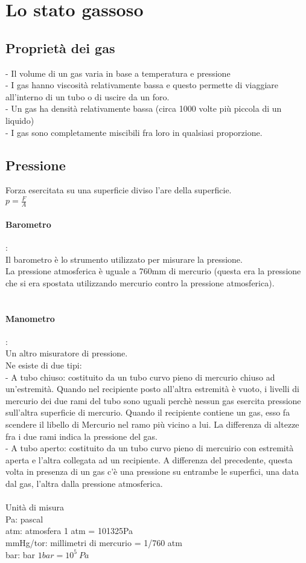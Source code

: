 \section{Lo stato gassoso}
\subsection{Proprietà dei gas}
\tab- Il volume di un gas varia in base a temperatura e pressione\\
\tab- I gas hanno viscosità relativamente bassa e questo permette di viaggiare all'interno di un tubo o di uscire da un foro.\\
\tab- Un gas ha densità relativamente bassa (circa 1000 volte più piccola di un liquido)\\
\tab- I gas sono completamente miscibili fra loro in qualsiasi proporzione.
\subsection{Pressione}
Forza esercitata su una superficie diviso l'are della superficie.\\
$p = \frac{F}{A}$\\
\paragraph*{Barometro}:\\
Il barometro è lo strumento utilizzato per misurare la pressione.\\
La pressione atmosferica è uguale a 760mm di mercurio (questa era la pressione che si era spostata utilizzando mercurio contro la pressione atmosferica).\\\\
\paragraph*{Manometro}:\\
Un altro misuratore di pressione.\\
Ne esiste di due tipi:\\
\tab- A tubo chiuso: costituito da un tubo curvo pieno di mercurio chiuso ad un'estremità. Quando nel recipiente posto all'altra estremità è vuoto, i livelli di mercurio dei due rami del tubo sono uguali perchè nessun gas esercita pressione sull'altra superficie di mercurio. Quando il recipiente contiene un gas, esso fa scendere il libello di Mercurio nel ramo più vicino a lui. La differenza di altezze fra i due rami indica la pressione del gas.\\ 
\tab- A tubo aperto: costituito da un tubo curvo pieno di mercuirio con estremità aperta e l'altra collegata ad un recipiente. A differenza del precedente, questa volta in presenza di un gas c'è una pressione su entrambe le superfici, una data dal gas, l'altra dalla pressione atmosferica.\\\\
Unità di misura\\
Pa: pascal\\
atm: atmosfera 1 atm = 101325Pa\\
mmHg/tor: millimetri di mercurio = 1/760 atm\\
bar: bar  $1 bar = 10^5\ Pa$
